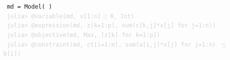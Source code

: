 \documentclass[]{beamer}
\newcommand*{\green}[1]{{\color{ngreen}#1}}
\newcommand*{\redxg}[1]{{\color{nred}#1}}
\begin{document}
\begin{frame}
{\begin{tcolorbox}[arc=1ex, colback=black!20, colframe=black!20, left=3pt, right=3pt, top=3pt, bottom=2pt]
\texttt{ \hspace{-1.5mm}\green{julia>} md = Model( ) }\\
%
\texttt{ \hspace{-2mm}\textcolor{lightgray}{julia>  @variable(md, x[1:n]$\ge$0, Int)}}\\
%
\texttt{ \hspace{-2mm}\textcolor{lightgray}{julia>  @expression(md, z[k=1:p], sum(c[k,j]*x[j] for j=1:n))}} \\
\texttt{ \hspace{-2mm}\textcolor{lightgray}{julia>  @objective(md, Max, [z[k] for k=1:p])}}\\
%
\texttt{ \hspace{-2mm}\textcolor{lightgray}{julia>   @constraint(md,  ct[i=1:m],  sum(a[i,j]*x[j] for j=1:n) $\le$ b[i])}}
\end{tcolorbox} 
}

\end{frame}


% 
%
\end{document}
